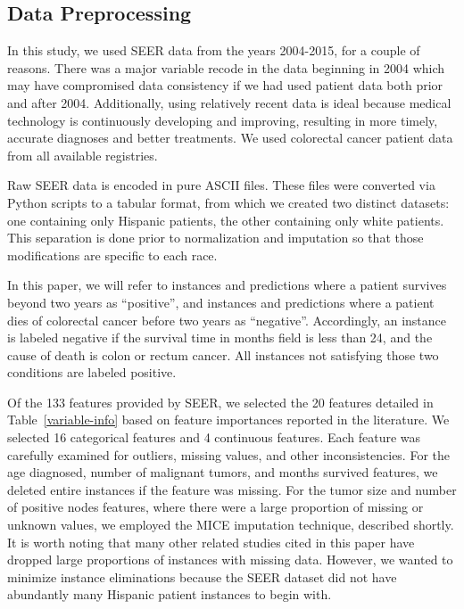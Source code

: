 \documentclass[review]{elsarticle}
\begin{document}
\subsection*{Data Preprocessing}
In this study, we used SEER data from the years 2004-2015, for a couple of reasons. There was a major variable recode in the data beginning in 2004 which may have compromised data consistency if we had used patient data both prior and after 2004. Additionally, using relatively recent data is ideal because medical technology is continuously developing and improving, resulting in more timely, accurate diagnoses and better treatments. We used colorectal cancer patient data from all available registries.

Raw SEER data is encoded in pure ASCII files. These files were converted via Python scripts to a tabular format, from which we created two distinct datasets: one containing only Hispanic patients, the other containing only white patients. This separation is done prior to normalization and imputation so that those modifications are specific to each race.

In this paper, we will refer to instances and predictions where a patient survives beyond two years as “positive”, and instances and predictions where a patient dies of colorectal cancer before two years as “negative”. Accordingly, an instance is labeled negative if the survival time in months field is less than 24, and the cause of death is colon or rectum cancer. All instances not satisfying those two conditions are labeled positive.

Of the 133 features provided by SEER, we selected the 20 features detailed in Table~\ref{variable-info} based on feature importances reported in the literature\cite{delen2005predicting,al2013colon}. We selected 16 categorical features and 4 continuous features. Each feature was carefully examined for outliers, missing values, and other inconsistencies. For the age diagnosed, number of malignant tumors, and months survived features, we deleted entire instances if the feature was missing. For the tumor size and number of positive nodes features,  where there were a large proportion of missing or unknown values, we employed the MICE imputation technique, described shortly. It is worth noting that many other related studies cited in this paper have dropped large proportions of instances with missing data. However, we wanted to minimize instance eliminations because the SEER dataset did not have abundantly many Hispanic patient instances to begin with.
\end{document}
